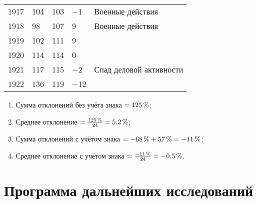 \documentclass[leqno]{article}  %
\begin{document}
\begin{table}
{\begin{tabular}{p{}|p{}|p{}|p{}|p{}}
1917 & \hfill 104 \hspace*{6mm} & \hfill 103 \hspace*{6mm} & \hfill \(-\)1 \hspace*{6mm} & Военные действия \\
1918 & \hfill 98 \hspace*{6mm} & \hfill 107 \hspace*{6mm} & \hfill 9 \hspace*{6mm} & Военные действия \\
1919 & \hfill 102 \hspace*{6mm} & \hfill 111 \hspace*{6mm} & \hfill 9 \hspace*{6mm} & \\
1920 & \hfill 114 \hspace*{6mm} & \hfill 114 \hspace*{6mm} & \hfill 0 \hspace*{6mm} & \\
1921 & \hfill 117 \hspace*{6mm} & \hfill 115 \hspace*{6mm} & \hfill \(-\)2 \hspace*{6mm} & Спад деловой активности \\
1922 & \hfill 136 \hspace*{6mm} & \hfill 119 \hspace*{6mm} & \hfill \(-\)12 \hspace*{6mm} & \\
\hline
\end{tabular}

\par

\begin{enumerate}[{(1)}]
\item Сумма отклонений без учёта знака \(= 125\text{\,\%}\);
\item Среднее отклонение \(= \frac{125\text{\,\%}}{24} = 5,\!2\text{\,\%}\);
\item Сумма отклонений с учётом знака \(= -68\text{\,\%}+57\text{\,\%} = -11\text{\,\%}\);
\item Среднее отклонение с учётом знака \(= \frac{-11\text{\,\%}}{24} = -0,\!5\text{\,\%}\).
\end{enumerate}
}
\end{table}

\section{Программа дальнейших исследований}
\end{document}
